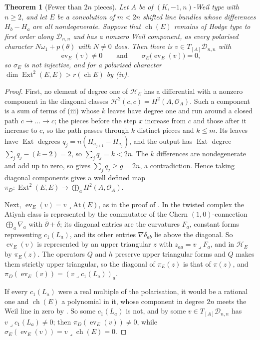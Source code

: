 \documentclass[11pt,reqno]{amsart}
\theoremstyle{plain}
\newtheorem{theorem}{Theorem}[section]
\theoremstyle{definition}
\theoremstyle{remark}
\newcommand{\cO}{\mathcal{O}}
\newcommand{\cH}{\mathcal{H}}
\newcommand{\cD}{\mathcal{D}}
\DeclareMathOperator{\ch}{ch}
\DeclareMathOperator{\Ext}{Ext}
\begin{document}
\begin{theorem}[Fewer than $2n$ pieces]\label{thm:fewpieces}
Let $A$ be of $(K,-1,n)$-Weil type with $n\ge2$, and let $E$ be a
convolution of $m<2n$ shifted line bundles whose differences $H_{b}-H_{a}$
are all nondegenerate. Suppose that $\ch(E)$ remains of Hodge type to first
order along $\cD_{n,n}$ and has a nonzero Weil component, as every polarised
character $N\omega_{1}+p(\theta)$ with $N\ne0$ does. Then there is
$v\in T_{[A]}\cD_{n,n}$ with
\[
  \operatorname{ev}_{E}(v)\ne0
  \qquad\text{and}\qquad
  \sigma_{E}\bigl(\operatorname{ev}_{E}(v)\bigr)=0 ,
\]
so $\sigma_{E}$ is not injective, and for a polarised character
$\dim\Ext^{2}(E,E)>r(\ch E)$ by (iv).
\end{theorem}

\begin{proof}
First, no element of degree one of $\cH_{E}$ has a differential with a
nonzero component in the diagonal classes $\cH^{2}(c,c)=H^{2}(A,\cO_{A})$.
Such a component is a sum of terms of (iii) whose
$k$ leaves have degree one and run around a closed path $c\to\dots\to c$; the
pieces before the step $x$ increase from $c$ and those after it increase to
$c$, so the path passes through $k$ distinct pieces and $k\le m$. Its
leaves have $\Ext$ degrees $q_{j}=n(H_{a_{j+1}}-H_{a_{j}})$, and the output
has $\Ext$ degree $\sum_{j}q_{j}-(k-2)=2$, so $\sum_{j}q_{j}=k<2n$. The $k$
differences are nondegenerate and add up to zero, so 
gives $\sum_{j}q_{j}\ge g=2n$, a contradiction. Hence taking diagonal
components gives a well defined map
$\pi_{D}\colon\Ext^{2}(E,E)\to\bigoplus_{a}H^{2}(A,\cO_{A})$.

Next, $\operatorname{ev}_{E}(v)=v\lrcorner\mathrm{At}(E)$, as in the proof
of \cite[Theorem~9.20]{paperI}. In the twisted complex the Atiyah class is
represented by the commutator of the Chern $(1,0)$-connection
$\bigoplus_{a}\nabla_{a}$ with $\bar\partial+\delta$; its diagonal entries
are the curvatures $F_{a}$, constant forms representing $c_{1}(L_{a})$, and
its other entries $\nabla\delta_{ab}$ lie above the diagonal. So
$\operatorname{ev}_{E}(v)$ is represented by an upper triangular $z$ with
$z_{aa}=v\lrcorner F_{a}$, and in $\cH_{E}$ by $\pi_{E}(z)$. The operators
$Q$ and $h$ preserve upper triangular forms and $Q$ makes them strictly upper
triangular, so the diagonal of $\pi_{E}(z)$ is that of $\pi(z)$, and
$\pi_{D}(\operatorname{ev}_{E}(v))=(v\lrcorner c_{1}(L_{a}))_{a}$.

If every $c_{1}(L_{a})$ were a real multiple of the polarisation, it would
be a rational one and $\ch(E)$ a polynomial in it, whose component in degree
$2n$ meets the Weil line in zero by \cite[Proposition~5.1]{paperI}. So some
$c_{1}(L_{a})$ is not, and by \cite[Proposition~9.15(i)]{paperI} some
$v\in T_{[A]}\cD_{n,n}$ has $v\lrcorner c_{1}(L_{a})\ne0$; then
$\pi_{D}(\operatorname{ev}_{E}(v))\ne0$, while
$\sigma_{E}(\operatorname{ev}_{E}(v))=v\lrcorner\ch(E)=0$.
\end{proof}
\end{document}
